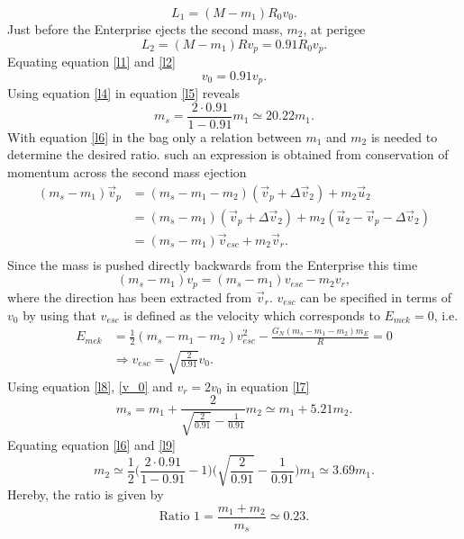 \begin{example}
\begin{enumerate}
		\begin{equation}
			L_1=(M-m_1)R_0v_0.
			\label{l1}
		\end{equation} 
		Just before the Enterprise ejects the second mass, $m_2$, at perigee
		\begin{equation}
			L_2=(M-m_1)Rv_p=0.91R_0v_p.
			\label{l2}
		\end{equation} 
		Equating equation \eqref{l1} and \eqref{l2}
		\begin{equation}
			v_0=0.91v_p.
			\label{l4}
		\end{equation} 
		Using equation \eqref{l4} in equation \eqref{l5} reveals
		\begin{equation}
			m_s=\frac{2\cdot 0.91}{1-0.91}m_1\simeq 20.22 m_1.
			\label{l6}
		\end{equation} 
		With equation \eqref{l6} in the bag only a relation between $m_1$ and $m_2$ is needed to determine the desired ratio. such an expression is obtained from conservation of momentum across the second mass ejection
		\begin{equation}
			\begin{split}
				(m_s-m_1)\vec{v}_p&=(m_s-m_1-m_2)(\vec{v}_p+\Delta \vec{v}_2)+m_2\vec{u}_2\\
				&=(m_s-m_1)(\vec{v}_p+\Delta \vec{v}_2)+m_2(\vec{u}_2-\vec{v}_p-\Delta \vec{v}_2)\\
				&=(m_s-m_1)\vec{v}_{esc}+m_2\vec{v}_r.\\
			\end{split}
		\end{equation} 
		Since the mass is pushed directly backwards from the Enterprise this time
		\begin{equation}	
			(m_s-m_1)v_p=(m_s-m_1)v_{esc}-m_2v_r,
			\label{l7}	
		\end{equation} 
		where the direction has been extracted from $\vec{v}_r$. $v_{esc}$ can be specified in terms of $v_0$ by using that $v_{esc}$ is defined as the velocity which corresponds to $E_{mek}=0$,  i.e.
		\begin{equation}
			\begin{split}
				E_{mek}&=\frac{1}{2}(m_s-m_1-m_2)v_{esc}^2-\frac{G_N(m_s-m_1-m_2)m_E}{R}=0\\
				&\Rightarrow v_{esc}=\sqrt{\frac{2}{0.91}}v_0.
			\end{split}
			\label{l8}
		\end{equation} 
		Using equation \eqref{l8}, \eqref{v_0} and $v_r=2v_0$ in equation \eqref{l7}
		\begin{equation}
			m_s= m_1+\frac{2}{\sqrt{\frac{2}{0.91}}-\frac{1}{0.91}}m_2\simeq m_1+5.21m_2.
			\label{l9}
		\end{equation} 
		Equating equation \eqref{l6} and \eqref{l9}
		\begin{equation}
			m_2\simeq\frac{1}{2}\bigg(\frac{2\cdot 0.91}{1-0.91}-1\bigg)\bigg(\sqrt{\frac{2}{0.91}}-\frac{1}{0.91}\bigg) m_1\simeq 3.69 m_1.
		\end{equation} 
		Hereby, the ratio is given by
		\begin{equation}
			\text{Ratio 1}=\frac{m_1+m_2}{m_s}\simeq 0.23.
			\label{ratio1}
		\end{equation} 
		

\end{enumerate}
\end{example}
